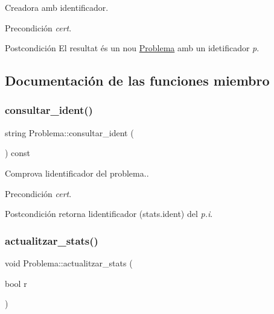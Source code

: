Creadora amb identificador. 

\begin{DoxyPrecond}{Precondición}
{\itshape cert}. 
\end{DoxyPrecond}
\begin{DoxyPostcond}{Postcondición}
El resultat és un nou \mbox{\hyperlink{class_problema}{Problema}} amb un idetificador {\itshape p}. 
\end{DoxyPostcond}


\subsection{Documentación de las funciones miembro}
\mbox{\label{class_problema_ad2221cdbaf6ddcf353f6a94e52c6256a}} 
\subsubsection{\texorpdfstring{consultar\+\_\+ident()}{consultar\_ident()}}
{\footnotesize\ttfamily string Problema\+::consultar\+\_\+ident (\begin{DoxyParamCaption}{ }\end{DoxyParamCaption}) const}



Comprova l\textquotesingle{}identificador del problema.. 

\begin{DoxyPrecond}{Precondición}
{\itshape cert}. 
\end{DoxyPrecond}
\begin{DoxyPostcond}{Postcondición}
retorna l\textquotesingle{}identificador (stats.\+ident) del {\itshape p.\+i}. 
\end{DoxyPostcond}
\mbox{\label{class_problema_a769d7920810acf042cdd6aa9c3236a0c}} 
\subsubsection{\texorpdfstring{actualitzar\+\_\+stats()}{actualitzar\_stats()}}
{\footnotesize\ttfamily void Problema\+::actualitzar\+\_\+stats (\begin{DoxyParamCaption}\item[{bool}]{r }\end{DoxyParamCaption})}



